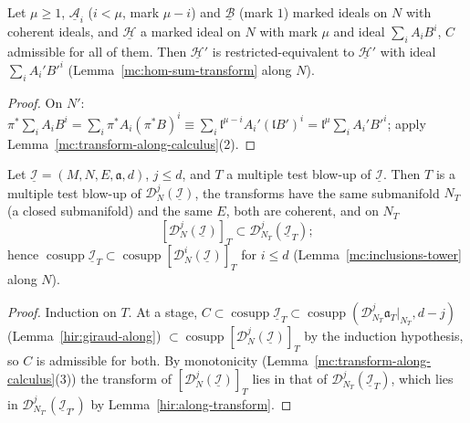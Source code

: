 \begin{lemma}
\label{mc:hom-sum-transform-along}
\leanok
Let \(\mu\ge1\), \(\underline{\mathcal A}_i\) (\(i<\mu\), mark \(\mu-i\)) and \(\underline{\mathcal B}\) (mark \(1\)) marked ideals on \(N\) with coherent ideals, and \(\underline{\mathcal H}\) a
marked ideal on \(N\) with mark \(\mu\) and ideal \(\sum_iA_iB^i\), \(C\) admissible for all of them. Then \(\underline{\mathcal H}'\) is restricted-equivalent to
\(\underline{\mathcal H}'\) with ideal \(\sum_iA_i'B'^i\) (Lemma~\ref{mc:hom-sum-transform} along \(N\)).
\end{lemma}
\begin{proof}
\leanok
On \(N'\): \(\pi^*\sum_iA_iB^i=\sum_i\pi^*A_i(\pi^*B)^i\equiv\sum_i\mathfrak l^{\mu-i}A_i'(\mathfrak lB')^i=\mathfrak l^\mu\sum_iA_i'B'^i\); apply
Lemma~\ref{mc:transform-along-calculus}(2).
\end{proof}

\begin{lemma}
\label{mc:inclusions-tower-along}
\leanok
Let \(\underline{\mathcal I}=(M,N,E,\mathfrak a,d)\), \(j\le d\), and \(T\) a multiple test blow-up of \(\underline{\mathcal I}\). Then \(T\) is a multiple test blow-up of
\(\mathcal D_N^j(\underline{\mathcal I})\), the transforms have the same submanifold \(N_T\) (a closed submanifold) and the same \(E\), both are coherent, and on \(N_T\)
\[[\mathcal D_N^j(\underline{\mathcal I})]_T\subset\mathcal D_{N_T}^j(\underline{\mathcal I}_T);\]
hence \(\operatorname{cosupp}\underline{\mathcal I}_T\subset\operatorname{cosupp}[\mathcal D_N^i(\underline{\mathcal I})]_T\) for \(i\le d\) (Lemma~\ref{mc:inclusions-tower} along \(N\)).
\end{lemma}
\begin{proof}
\leanok
Induction on \(T\). At a stage, \(C\subset\operatorname{cosupp}\underline{\mathcal I}_T\subset\operatorname{cosupp}(\mathcal D_{N_T}^j\mathfrak a_T|_{N_T},d-j)\) (Lemma~\ref{hir:giraud-along})
\(\subset\operatorname{cosupp}[\mathcal D_N^j(\underline{\mathcal I})]_T\) by the induction hypothesis, so \(C\) is admissible for both. By monotonicity
(Lemma~\ref{mc:transform-along-calculus}(3)) the transform of \([\mathcal D_N^j(\underline{\mathcal I})]_T\) lies in that of \(\mathcal D_{N_T}^j(\underline{\mathcal I}_T)\), which lies in
\(\mathcal D_{N_{T'}}^j(\underline{\mathcal I}_{T'})\) by Lemma~\ref{hir:along-transform}.
\end{proof}

